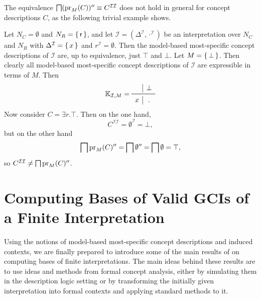 The equivalence $\bigsqcap (\operatorname{pr}_M(C))'' \equiv C^{\mathcal{I}\mathcal{I}}$ does not hold
in general for concept descriptions $C$, as the following trivial example shows.

\begin{Example}
  \label{expl:counterexample}
  Let $N_C = \emptyset$ and $N_R = {\{\, \mathsf{r} \,\}}$, and let $\mathcal{I} =
  (\Delta^{\mathcal{I}}, \cdot^{\mathcal{I}})$ be an interpretation over $N_C$ and $N_R$
  with $\Delta^{\mathcal{I}} = {\{\, x \,\}}$ and $r^{\mathcal{I}} = \emptyset$.  Then the
  model-based most-specific concept descriptions of $\mathcal{I}$ are, up to equivalence,
  just $\top$ and $\bot$.  Let $M = {\{\, \bot \,\}}$.  Then clearly all model-based
  most-specific concept descriptions of $\mathcal{I}$ are expressible in terms of $M$.
  Then
  \begin{equation*}
    \con K_{\mathcal{I}, M} =
    \begin{array}{c|c}
      ~ & \bot \\\midrule
      x & . \\
    \end{array}
  \end{equation*}
  Now consider $C = \exists r. \top$.  Then on the one hand,
  \begin{equation*}
    C^{\mathcal{I}\mathcal{I}} = \emptyset^{\mathcal{I}} = \bot,
  \end{equation*}
  but on the other hand
  \begin{equation*}
    \bigsqcap \operatorname{pr}_M(C)'' = \bigsqcap \emptyset'' = \bigsqcap \emptyset = \top,
  \end{equation*}
  so $C^{\mathcal{I}\mathcal{I}} \neq \bigsqcap \operatorname{pr}_M(C)''$.
\end{Example}

\section{Computing Bases of Valid GCIs of a Finite Interpretation}
\label{sec:base-all-valid}


Using the notions of model-based most-specific concept descriptions and induced contexts,
we are finally prepared to introduce some of the main results of \textcite{Diss-Felix} on
computing bases of finite interpretations.  The main ideas behind these results are to use
ideas and methods from formal concept analysis, either by simulating them in the
description logic setting or by transforming the initially given interpretation into
formal contexts and applying standard methods to it.

